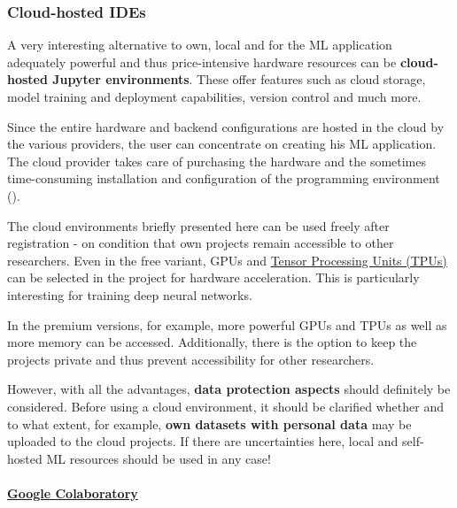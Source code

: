 \documentclass [oneside,10pt,a4paper,ngerman,BCOR10mm,headsepline,parindent,final]{scrartcl}
\begin{document}
    \hypertarget{cloud-hosted-ides}{%
\subsubsection{Cloud-hosted IDEs}\label{cloud-hosted-ides}}

A very interesting alternative to own, local and for the ML application
adequately powerful and thus price-intensive hardware resources can be
\textbf{cloud-hosted Jupyter environments}. These offer features such as
cloud storage, model training and deployment capabilities, version
control and much more.

Since the entire hardware and backend configurations are hosted in the
cloud by the various providers, the user can concentrate on creating his
ML application. The cloud provider takes care of purchasing the hardware
and the sometimes time-consuming installation and configuration of the
programming environment (\cite{Colab_Alternatives_2021}).

The cloud environments briefly presented here can be used freely after
registration - on condition that own projects remain accessible to other
researchers. Even in the free variant, GPUs and
\href{https://en.wikipedia.org/wiki/Tensor_Processing_Unit}{Tensor
Processing Units (TPUs)} can be selected in the project for hardware
acceleration. This is particularly interesting for training deep neural
networks.

In the premium versions, for example, more powerful GPUs and TPUs as
well as more memory can be accessed. Additionally, there is the option
to keep the projects private and thus prevent accessibility for other
researchers.

However, with all the advantages, \textbf{data protection aspects}
should definitely be considered. Before using a cloud environment, it
should be clarified whether and to what extent, for example, \textbf{own
datasets with personal data} may be uploaded to the cloud projects. If
there are uncertainties here, local and self-hosted ML resources should
be used in any case!

    \hypertarget{google-colaboratory}{%
\paragraph{\texorpdfstring{\href{https://colab.research.google.com/}{Google
Colaboratory}}{Google Colaboratory}}\label{google-colaboratory}}
\end{document}
